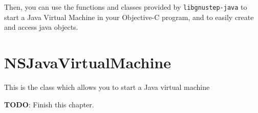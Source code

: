 Then, you can use the functions and classes provided by
\texttt{libgnustep-java} to start a Java Virtual Machine in your
Objective-C program, and to easily create and access java objects.

\section{NSJavaVirtualMachine}

This is the class which allows you to start a Java virtual machine 

\par
{\bf TODO}: Finish this chapter.
